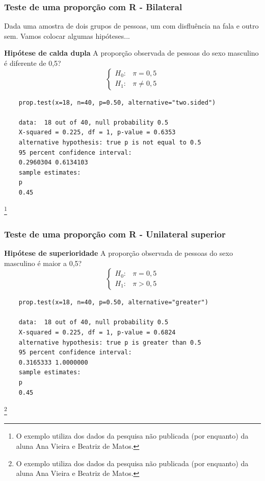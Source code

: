 \documentclass[graphics,14pt]{beamer}
\newcommand{\lfr}[1]{\let\thefootnote\relax\footnote{\hspace{0.6cm}\vspace{1.25cm} #1}}
\begin{document}
\begin{frame}[t,fragile=singleslide]
\frametitle{Teste de uma proporção com R - Bilateral}
	Dada uma amostra de dois grupos de pessoas, um com disfluência na fala e outro sem. Vamos colocar algumas hipóteses...
	
	\textbf{Hipótese de calda dupla}
	A proporção observada de pessoas do sexo masculino é diferente de 0,5?
	\begin{equation*}
	\left\{ \begin{array}{cl}
	H_0: & \pi = 0,5 \\
	H_1: & \pi \neq 0,5
	\end{array}\right.
	\end{equation*}
	
	\begin{lstlisting}
	prop.test(x=18, n=40, p=0.50, alternative="two.sided")
	
	data:  18 out of 40, null probability 0.5
	X-squared = 0.225, df = 1, p-value = 0.6353
	alternative hypothesis: true p is not equal to 0.5
	95 percent confidence interval:
	0.2960304 0.6134103
	sample estimates:
	p 
	0.45
	\end{lstlisting}
	
	\lfr{O exemplo utiliza dos dados da pesquisa não publicada (por enquanto) da aluna Ana Vieira e Beatriz de Matos.}
\end{frame}
\begin{frame}[t,fragile=singleslide]
\frametitle{Teste de uma proporção com R - Unilateral superior}
	\textbf{Hipótese de superioridade}
	A proporção observada de pessoas do sexo masculino é maior a 0,5?
	\begin{equation*}
	\left\{ \begin{array}{cl}
	H_0: & \pi = 0,5 \\
	H_1: & \pi > 0,5
	\end{array}\right.
	\end{equation*}
	
	\begin{lstlisting}
	prop.test(x=18, n=40, p=0.50, alternative="greater")
	
	data:  18 out of 40, null probability 0.5
	X-squared = 0.225, df = 1, p-value = 0.6824
	alternative hypothesis: true p is greater than 0.5
	95 percent confidence interval:
	0.3165333 1.0000000
	sample estimates:
	p 
	0.45 
	\end{lstlisting}

\lfr{O exemplo utiliza dos dados da pesquisa não publicada (por enquanto) da aluna Ana Vieira e Beatriz de Matos.}
\end{frame}
\end{document}
